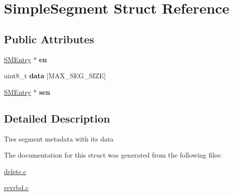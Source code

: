 \hypertarget{structSimpleSegment}{\section{\-Simple\-Segment \-Struct \-Reference}
\label{structSimpleSegment}
}
\subsection*{\-Public \-Attributes}
\begin{DoxyCompactItemize}
\item 
\hypertarget{structSimpleSegment_a0b153503362c1d0e984e84c53d346b1c}{\hyperlink{structSMEntry}{\-S\-M\-Entry} $\ast$ {\bfseries en}}\label{structSimpleSegment_a0b153503362c1d0e984e84c53d346b1c}

\item 
\hypertarget{structSimpleSegment_a61ffb9394ae3b874c368c31180eabd88}{uint8\-\_\-t {\bfseries data} \mbox{[}\-M\-A\-X\-\_\-\-S\-E\-G\-\_\-\-S\-I\-Z\-E\mbox{]}}\label{structSimpleSegment_a61ffb9394ae3b874c368c31180eabd88}

\item 
\hypertarget{structSimpleSegment_a7d8bcd6c3424b215b7c5924314bd0d18}{\hyperlink{structSMEntry}{\-S\-M\-Entry} $\ast$ {\bfseries sen}}\label{structSimpleSegment_a7d8bcd6c3424b215b7c5924314bd0d18}

\end{DoxyCompactItemize}


\subsection{\-Detailed \-Description}
\-Ties segment metadata with its data 

\-The documentation for this struct was generated from the following files\-:\begin{DoxyCompactItemize}
\item 
\hyperlink{delete_8c}{delete.\-c}\item 
\hyperlink{revrbd_8c}{revrbd.\-c}\end{DoxyCompactItemize}
